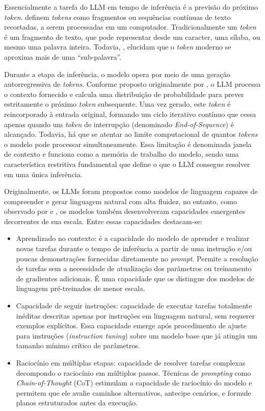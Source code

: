 \documentclass[12pt,oneside,a4paper,brazil,sumario=tradicional]{abntex2}
\begin{document}
Essencialmente a tarefa do LLM em tempo de inferência é a previsão do próximo \textit{token}. \textcite{webster1992} definem \textit{tokens} como fragmentos ou sequências contínuas de texto recortadas, a serem processadas em um computador. Tradicionalmente um \textit{token} é um fragmento de texto, que pode representar desde um caracter, uma sílaba, ou mesmo uma palavra inteira. Todavia, \textcite{mielke2021}, elucidam que o \textit{token} moderno se aproxima mais de uma “sub-palavra”.

Durante a etapa de inferência, o modelo opera por meio de uma geração autorregressiva de \textit{tokens}. Conforme proposto originalmente por \textcite{vaswani2017}, o LLM processa o contexto fornecido e calcula uma distribuição de probabilidade para prever estritamente o próximo \textit{token} subsequente. Uma vez gerado, este \textit{token} é reincorporado à entrada original, formando um ciclo iterativo contínuo que cessa apenas quando um \textit{token} de interrupção (denominado \textit{End-of-Sequence}) é alcançado. Todavia, há que se atentar ao limite computacional de quantos \textit{tokens }o modelo pode processar simultaneamente. Essa limitação é denominada janela de contexto e funciona como a memória de trabalho do modelo, sendo uma característica restritiva fundamental que define o que o LLM consegue resolver em uma única inferência.

Originalmente, os LLMs foram propostos como modelos de linguagem capazes de compreender e gerar linguagem natural com alta fluidez, no entanto, como observado por \textcite{minaee2024} e \textcite{zhao2023}, os modelos também desenvolveram capacidades emergentes decorrentes de sua escala. Entre essas capacidades destacam-se:

\begin{itemize}
  \item Aprendizado no contexto: é a capacidade do modelo de aprender e realizar novas tarefas durante o tempo de inferência a partir de uma instrução e/ou poucas demonstrações fornecidas diretamente no \textit{prompt}. Permite a resolução de tarefas sem a necessidade de atualização dos parâmetros ou treinamento de gradientes adicionais. É uma capacidade que os distingue dos modelos de linguagem pré-treinados de menor escala.
  \item Capacidade de seguir instruções: capacidade de executar tarefas totalmente inéditas descritas apenas por instruções em linguagem natural, sem requerer exemplos explícitos. Essa capacidade emerge após procedimento de ajuste para instruções  (\textit{instruction tuning}) sobre um modelo base que já atingiu um tamanho mínimo crítico de parâmetros.
  \item Raciocínio em múltiplas etapas: capacidade de resolver tarefas complexas decompondo o raciocínio em múltiplos passos. Técnicas de \textit{prompting} como \textit{Chain-of-Thought} (CoT) estimulam a capacidade de raciocínio do modelo e permitem que ele avalie caminhos alternativos, antecipe cenários, e formule planos estruturados antes da execução.
\end{itemize}
\end{document}
